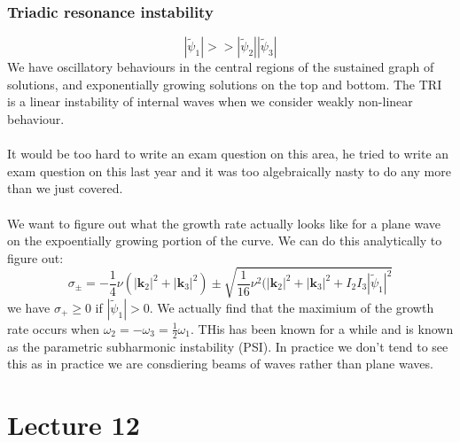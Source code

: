 \documentclass{article}
\begin{document}
\subsubsection{Triadic resonance instability}
$$
|\tilde \psi_1| >> |\tilde \psi_2 | | \tilde \psi_3|
$$
We have oscillatory behaviours in the central regions of the sustained graph of solutions, and exponentially growing solutions on the top and bottom.
The TRI is a linear instability of internal waves when we consider weakly non-linear behaviour.\\\\
It would be too hard to write an exam question on this area, he tried to write an exam question on this last year and it was too algebraically nasty to do any more than we just covered.\\\\
We want to figure out what the growth rate actually looks like for a plane wave on the expoentially growing portion of the curve. We can do this analytically to figure out:
$$
\sigma_{\pm} = - \frac{1}{4} \nu( |\bm k_2 |^2 + |\bm k_3|^2) \pm \sqrt{ \frac{1}{16} \nu^2 ( |\bm k_2|^2 + |\bm k_3|^2 + I_2 I_3 |\tilde \psi_1|^2}
$$
we have $\sigma_+ \geq 0$ if $|\tilde \psi_1| > 0$. We actually find that the maximium of the growth rate occurs when $\omega_2 = - \omega_3 = \frac{1}{2} \omega_1$. THis has been known for a while and is known as the parametric subharmonic instability (PSI). In practice we don't tend to see this as in practice we are consdiering beams of waves rather than plane waves.
\section{Lecture 12}
\end{document}
